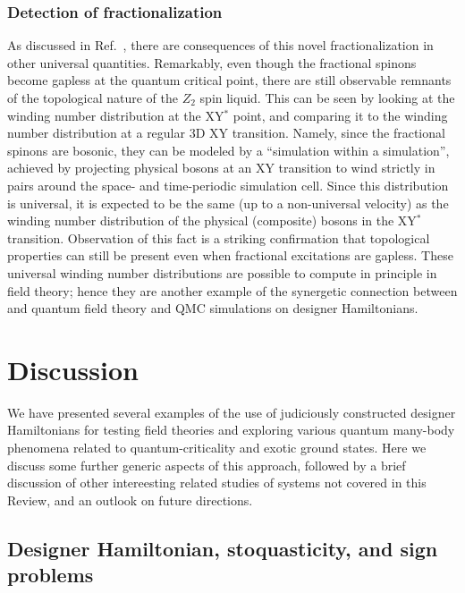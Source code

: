 \documentclass[10pt,pre,aps,twocolumn,showpacs,subscriptaddresses,floatfix]{revtex4}
\begin{document}
\subsubsection{Detection of fractionalization}

As discussed in Ref.~\cite{XYstarQMC}, there are consequences of this novel fractionalization in other universal quantities.  Remarkably, even though the fractional spinons become gapless at the quantum critical point, there are still observable remnants of the topological nature of the $Z_2$ spin liquid.  This can be seen by looking at the winding number distribution at the 
XY$^*$ point, and comparing it to the winding number distribution at a regular 3D XY transition.  Namely, since the fractional spinons are bosonic, they can be modeled by a ``simulation within a simulation'', achieved by projecting physical bosons at an XY transition to wind strictly in pairs around the space- and time-periodic simulation cell.  Since this distribution is universal, it is expected to be the same (up to a non-universal velocity) as the winding number distribution of the physical (composite) bosons in the XY$^*$ transition.  Observation of this fact \cite{XYstarQMC} is a striking confirmation that topological properties can still be present even when fractional excitations are gapless.  These universal winding number distributions are possible to compute in principle in field theory; hence they are another example of the synergetic connection between and quantum field theory and QMC simulations on designer Hamiltonians.

\section{Discussion}
\label{sec:discussion}

We have presented several examples of the use of judiciously constructed designer Hamiltonians for testing field theories
and exploring various quantum many-body phenomena related to quantum-criticality and exotic ground states. Here we discuss some further 
generic aspects of this approach, followed by a brief discussion of other intereesting related studies of systems not covered in this 
Review, and an outlook on future directions.

\subsection{Designer Hamiltonian, stoquasticity, and sign problems}
\end{document}
